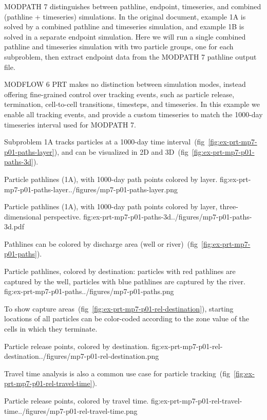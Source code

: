 MODPATH 7 distinguishes between pathline, endpoint, timeseries, and combined (pathline + timeseries) simulations. In the original document, example 1A is solved by a combined pathline and timeseries simulation, and example 1B is solved in a separate endpoint simulation. Here we will run a single combined pathline and timeseries simulation with two particle groups, one for each subproblem, then extract endpoint data from the MODPATH 7 pathline output file.

MODFLOW 6 PRT makes no distinction between simulation modes, instead offering fine-grained control over tracking events, such as particle release, termination, cell-to-cell transitions, timesteps, and timeseries. In this example we enable all tracking events, and provide a custom timeseries to match the 1000-day timeseries interval used for MODPATH 7.

Subproblem 1A tracks particles at a 1000-day time interval~(fig~\ref{fig:ex-prt-mp7-p01-paths-layer}), and can be visualized in 2D and 3D~(fig~\ref{fig:ex-prt-mp7-p01-paths-3d}).

\begin{StandardFigure}{
    Particle pathlines (1A), with 1000-day path points colored by layer.
    }{fig:ex-prt-mp7-p01-paths-layer}{../figures/mp7-p01-paths-layer.png}
\end{StandardFigure}

\begin{StandardFigure}{
    Particle pathlines (1A), with 1000-day path points colored by layer, three-dimensional perspective.
    }{fig:ex-prt-mp7-p01-paths-3d}{../figures/mp7-p01-paths-3d.pdf}
\end{StandardFigure}

Pathlines can be colored by discharge area (well or river)~(fig~\ref{fig:ex-prt-mp7-p01-paths}).

\begin{StandardFigure}{
    Particle pathlines, colored by destination: particles with red pathlines are captured by the well, particles with blue pathlines are captured by the river.
    }{fig:ex-prt-mp7-p01-paths}{../figures/mp7-p01-paths.png}
\end{StandardFigure}

To show capture areas~(fig~\ref{fig:ex-prt-mp7-p01-rel-destination}), starting locations of all particles can be color-coded according to the zone value of the cells in which they terminate.

\begin{StandardFigure}{
    Particle release points, colored by destination.
    }{fig:ex-prt-mp7-p01-rel-destination}{../figures/mp7-p01-rel-destination.png}
\end{StandardFigure}

Travel time analysis is also a common use case for particle tracking~(fig~\ref{fig:ex-prt-mp7-p01-rel-travel-time}).

\begin{StandardFigure}{
    Particle release points, colored by travel time.
    }{fig:ex-prt-mp7-p01-rel-travel-time}{../figures/mp7-p01-rel-travel-time.png}
\end{StandardFigure}
